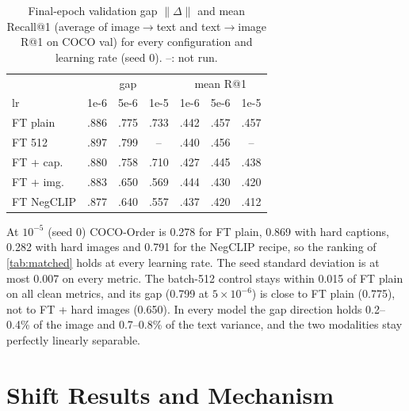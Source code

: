 \documentclass{article}
\newcommand{\gapnorm}{\lVert\Delta\rVert}
\begin{document}
\begin{table}[H]
\caption{Final-epoch validation gap $\gapnorm$ and mean Recall@1 (average of image$\to$text and text$\to$image R@1 on COCO val) for every configuration and learning rate (seed 0). --: not run.}
\label{tab:valgap}
\begin{center}
\begin{small}
\setlength{\tabcolsep}{3pt}
\begin{tabular}{lcccccc}
\toprule
& \multicolumn{3}{c}{gap} & \multicolumn{3}{c}{mean R@1} \\
lr & 1e-6 & 5e-6 & 1e-5 & 1e-6 & 5e-6 & 1e-5 \\
\midrule
FT plain & .886 & .775 & .733 & .442 & .457 & .457 \\
FT 512 & .897 & .799 & -- & .440 & .456 & -- \\
FT + cap. & .880 & .758 & .710 & .427 & .445 & .438 \\
FT + img. & .883 & .650 & .569 & .444 & .430 & .420 \\
FT NegCLIP & .877 & .640 & .557 & .437 & .420 & .412 \\
\bottomrule
\end{tabular}
\end{small}
\end{center}
\vskip -0.1in
\end{table}

At $10^{-5}$ (seed 0) COCO-Order is 0.278 for FT plain, 0.869 with hard captions, 0.282 with hard images and 0.791 for the NegCLIP recipe, so the ranking of \cref{tab:matched} holds at every learning rate. The seed standard deviation is at most 0.007 on every metric. The batch-512 control stays within 0.015 of FT plain on all clean metrics, and its gap (0.799 at $5{\times}10^{-6}$) is close to FT plain (0.775), not to FT + hard images (0.650). In every model the gap direction holds 0.2--0.4\% of the image and 0.7--0.8\% of the text variance, and the two modalities stay perfectly linearly separable.

\section{Shift Results and Mechanism}
\label{app:shift}\label{app:mechanism}
\end{document}
